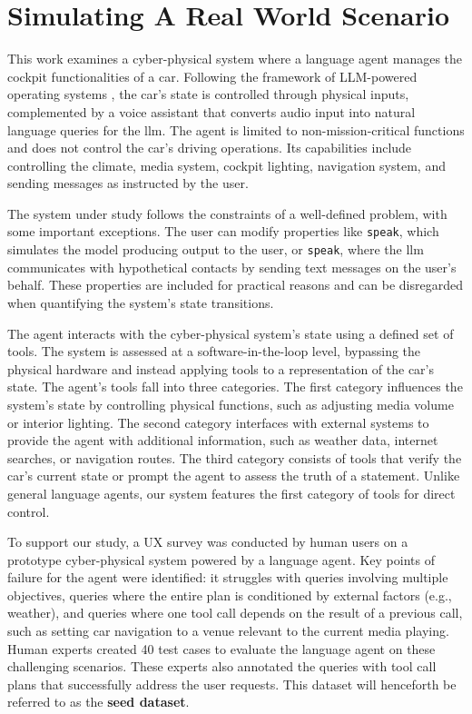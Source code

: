 \section{Simulating A Real World Scenario}

This work examines a cyber-physical system where a language agent manages the cockpit functionalities of a car. Following the framework of LLM-powered operating systems \cite{aiasos}, the car’s state is controlled through physical inputs, complemented by a voice assistant that converts audio input into natural language queries for the \gls{llm}. The agent is limited to non-mission-critical functions and does not control the car’s driving operations. Its capabilities include controlling the climate, media system, cockpit lighting, navigation system, and sending messages as instructed by the user.

\pskip

The system under study follows the constraints of a well-defined problem, with some important exceptions. The user can modify properties like \texttt{speak}, which simulates the model producing output to the user, or \texttt{speak}, where the \gls{llm} communicates with hypothetical contacts by sending text messages on the user’s behalf. These properties are included for practical reasons and can be disregarded when quantifying the system’s state transitions.



The agent interacts with the cyber-physical system’s state using a defined set of tools. The system is assessed at a software-in-the-loop level, bypassing the physical hardware and instead applying tools to a representation of the car’s state. The agent’s tools fall into three categories. The first category influences the system’s state by controlling physical functions, such as adjusting media volume or interior lighting. The second category interfaces with external systems to provide the agent with additional information, such as weather data, internet searches, or navigation routes. The third category consists of tools that verify the car’s current state or prompt the agent to assess the truth of a statement. Unlike general language agents, our system features the first category of tools for direct control.

\pskip


To support our study, a UX survey was conducted by human users on a prototype cyber-physical system powered by a language agent. Key points of failure for the agent were identified: it struggles with queries involving multiple objectives, queries where the entire plan is conditioned by external factors (e.g., weather), and queries where one tool call depends on the result of a previous call, such as setting car navigation to a venue relevant to the current media playing. Human experts created 40 test cases to evaluate the language agent on these challenging scenarios. These experts also annotated the queries with tool call plans that successfully address the user requests. This dataset will henceforth be referred to as the \textbf{seed dataset}.

\pskip




\FloatBarrier